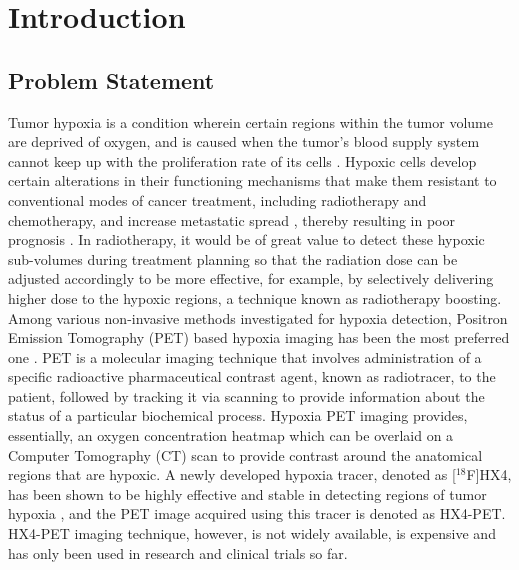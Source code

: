 \chapter{Introduction}
\label{Introduction}

\section{Problem Statement}
Tumor hypoxia is a condition wherein certain regions within the tumor volume are deprived of oxygen, and is caused when the tumor's blood supply system cannot keep up with the proliferation rate of its cells \cite{hockel2001tumor}. Hypoxic cells develop certain alterations in their functioning mechanisms that make them resistant to conventional modes of cancer treatment, including radiotherapy and chemotherapy, and increase metastatic spread \cite{muz2015role}, thereby resulting in poor prognosis \cite{vaupel2007hypoxia}. In radiotherapy, it would be of great value to detect these hypoxic sub-volumes during treatment planning so that the radiation dose can be adjusted accordingly to be more effective, for example, by selectively delivering higher dose to the hypoxic regions, a technique known as radiotherapy boosting. Among various non-invasive methods investigated for hypoxia detection, Positron Emission Tomography (PET) based hypoxia imaging has been the most preferred one \cite{fleming2015imaging}. PET is a molecular imaging technique that involves administration of a specific radioactive pharmaceutical contrast agent, known as radiotracer, to the patient, followed by tracking it via scanning to provide information about the status of a particular biochemical process. Hypoxia PET imaging provides, essentially, an oxygen concentration heatmap which can be overlaid on a Computer Tomography (CT) scan to provide contrast around the anatomical regions that are hypoxic. A newly developed hypoxia tracer, denoted as [$^{18}$F]HX4, has been shown to be highly effective and stable in detecting regions of tumor hypoxia \cite{sanduleanu2020hypoxia}, and the PET image acquired using this tracer is denoted as HX4-PET. HX4-PET imaging technique, however, is not widely available, is expensive and has only been used in research and clinical trials so far. 

